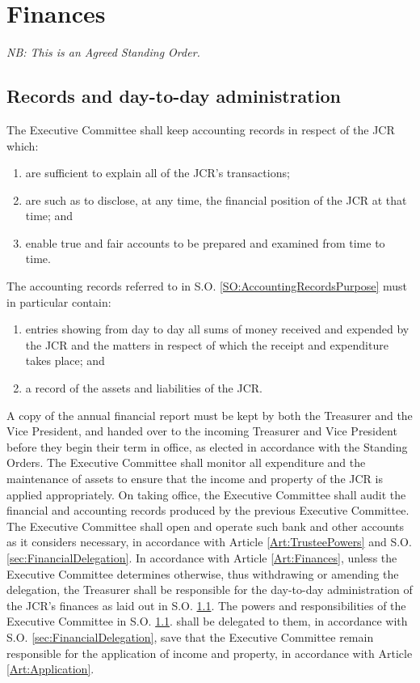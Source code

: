\chapter{Finances} \label{ch:finances}
\textit{NB: This is an Agreed Standing Order.}
\section{Records and day-to-day administration} \label{sec:FinancialRecords}
\npara \label{SO:AccountingRecordsPurpose} The Executive Committee shall keep accounting records in respect of the JCR which:
\begin{enumerate}
\item are sufficient to explain all of the JCR's transactions;
\item are such as to disclose, at any time, the financial position of the JCR at that time; and
\item enable true and fair accounts to be prepared and examined from time to time.
\end{enumerate}
\npara The accounting records referred to in S.O. \ref{SO:AccountingRecordsPurpose} must in particular contain:
\begin{enumerate}
\item entries showing from day to day all sums of money received and expended by the JCR and the matters in respect of which the receipt and expenditure takes place; and
\item a record of the assets and liabilities of the JCR.
\end{enumerate}
\npara \label{SO:FinancialReportCopy} A copy of the annual financial report must be kept by both the Treasurer and the Vice President, and handed over to the incoming Treasurer and Vice President before they begin their term in office, as elected in accordance with the Standing Orders.
\npara The Executive Committee shall monitor all expenditure and the maintenance of assets to ensure that the income and property of the JCR is applied appropriately.
\npara On taking office, the Executive Committee shall audit the financial and accounting records produced by the previous Executive Committee.
\npara The Executive Committee shall open and operate such bank and other accounts as it considers  necessary, in accordance with Article \ref{Art:TrusteePowers} and S.O. \ref{sec:FinancialDelegation}.
\npara In accordance with Article \ref{Art:Finances}, unless the Executive Committee determines otherwise, thus withdrawing or amending the delegation, the Treasurer shall be responsible for the day-to-day administration of the JCR's finances as laid out in S.O. \ref{sec:FinancialRecords}.  The powers and responsibilities of the Executive Committee in S.O. \ref{sec:FinancialRecords}. shall be delegated to them, in accordance with S.O. \ref{sec:FinancialDelegation}, save that the Executive Committee remain responsible for the application of income and property, in accordance with Article \ref{Art:Application}.
